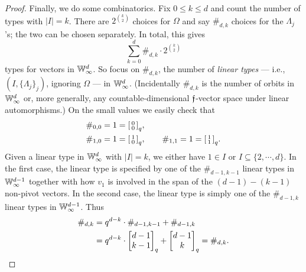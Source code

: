 \begin{proof}
    Finally, we do some combinatorics.
    Fix $0 \leq k \leq d$ and count the number of types with $|I| = k$.
    There are $2^{\binom{k}{2}}$ choices for $\Omega$ and say $\#_{d, k}$ choices for the $\Lambda_j$'s;
    the two can be chosen separately.
    In total, this gives
    \[ 
        \sum_{k=0}^d \#_{d, k} \cdot 2^{\binom{k}{2}}
    \]
    types for vectors in $\mathbb{W}_\infty^d$.
    So focus on $\#_{d, k}$, the number of \emph{linear types} --- i.e., $(I, \{\Lambda_j\}_j)$, ignoring $\Omega$ --- in $\mathbb{W}_\infty^d$.
    (Incidentally $\#_{d, k}$ is the number of orbits in $\mathbb{W}_\infty^d$ or, more generally, any countable-dimensional $\mathfrak{f}$-vector space under linear automorphisms.)
    On the small values we easily check that \begin{align*}
        &\#_{0, 0} = 1 = \begin{bsmallmatrix}0 \\ 0\end{bsmallmatrix}_q, \\
        &\#_{1, 0} = 1 = \begin{bsmallmatrix}1 \\ 0\end{bsmallmatrix}_q,\qquad
        \#_{1, 1} = 1 = \begin{bsmallmatrix}1 \\ 1\end{bsmallmatrix}_q.
    \end{align*}
    Given a linear type in $\mathbb{W}_\infty^d$ with $\vert I \vert = k$, 
    we either have $1 \in I$ or $I \subseteq \{2, \cdots, d\}$.
    In the first case, the linear type is specified by one of the $\#_{d-1, k-1}$ linear types in $\mathbb{W}_\infty^{d-1}$
    together with how $v_1$ is involved in the span of the $(d - 1) - (k - 1)$ non-pivot vectors.
    In the second case, the linear type is simply one of the $\#_{d-1, k}$ linear types in $\mathbb{W}_\infty^{d-1}$.
    Thus 
    \begin{align*}
        \#_{d, k} 
        &= q^{d-k} \cdot \#_{d-1, k-1} + \#_{d-1, k} \\
        &= q^{d-k} \cdot \begin{bmatrix}d-1 \\ k-1\end{bmatrix}_q + \begin{bmatrix}d-1 \\ k\end{bmatrix}_q
        = \#_{d, k}.
        \qedhere
    \end{align*}
\end{proof}

